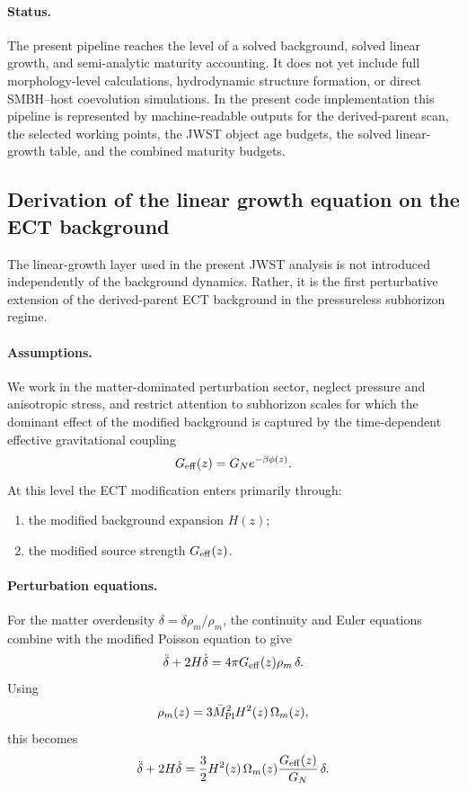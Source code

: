 \documentclass[11pt,a4paper]{article}
\numberwithin{equation}{section}
\begin{document}
\paragraph{Status.}
The present pipeline reaches the level of a solved background, solved
linear growth, and semi-analytic maturity accounting.
It does not yet include full morphology-level calculations, hydrodynamic
structure formation, or direct SMBH--host coevolution simulations.
In the present code implementation this pipeline is represented by
machine-readable outputs for the derived-parent scan, the selected
working points, the JWST object age budgets, the solved linear-growth
table, and the combined maturity budgets.

\subsection{Derivation of the linear growth equation on the ECT background}
\label{sec:ect_linear_growth_derivation}

The linear-growth layer used in the present JWST analysis is not
introduced independently of the background dynamics.
Rather, it is the first perturbative extension of the derived-parent ECT
background in the pressureless subhorizon regime.

\paragraph{Assumptions.}
We work in the matter-dominated perturbation sector, neglect pressure and
anisotropic stress, and restrict attention to subhorizon scales for
which the dominant effect of the modified background is captured by the
time-dependent effective gravitational coupling
\[
G_{\rm eff}(z)=G_N e^{-\beta\phi(z)}.
\]
At this level the ECT modification enters primarily through:
\begin{enumerate}
  \item the modified background expansion $H(z)$;
  \item the modified source strength $G_{\rm eff}(z)$.
\end{enumerate}

\paragraph{Perturbation equations.}
For the matter overdensity $\delta=\delta\rho_m/\rho_m$, the continuity
and Euler equations combine with the modified Poisson equation to give
\[
\ddot{\delta}+2H\dot{\delta}
=
4\pi G_{\rm eff}(z)\rho_m\,\delta.
\]
Using
\[
\rho_m(z)=3\bar M_{\rm Pl}^2 H^2(z)\,\Omega_m(z),
\]
this becomes
\[
\ddot{\delta}+2H\dot{\delta}
=
\frac{3}{2}H^2(z)\,\Omega_m(z)\frac{G_{\rm eff}(z)}{G_N}\,\delta.
\]
\end{document}
